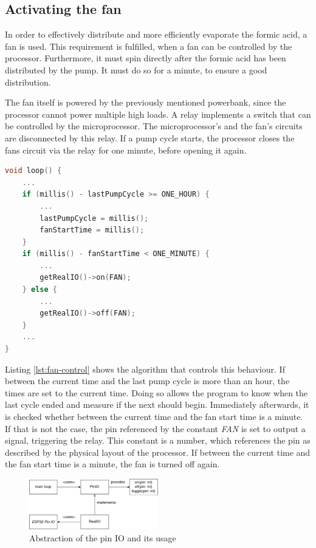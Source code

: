 \subsection{Activating the fan}\label{subsec:activating-the-fan}

In order to effectively distribute and more efficiently evaporate the formic acid, a fan is used.
This requirement is fulfilled, when a fan can be controlled by the processor.
Furthermore, it must spin directly after the formic acid has been distributed by the pump.
It must do so for a minute, to ensure a good distribution.

The fan itself is powered by the previously mentioned powerbank, since the processor cannot power multiple high loads.
A relay implements a switch that can be controlled by the microprocessor.
The microprocessor's and the fan's circuits are disconnected by this relay.
If a pump cycle starts, the processor closes the fans circuit via the relay for one minute, before opening it again.

\begin{lstlisting}[label={lst:fan-control},language=C++, caption=Controling the fan]
void loop() {
    ...
    if (millis() - lastPumpCycle >= ONE_HOUR) {
        ...
        lastPumpCycle = millis();
        fanStartTime = millis();
    }
    if (millis() - fanStartTime < ONE_MINUTE) {
        ...
        getRealIO()->on(FAN);
    } else {
        ...
        getRealIO()->off(FAN);
    }
    ...
}
\end{lstlisting}

Listing \ref{lst:fan-control} shows the algorithm that controls this behaviour.
If between the current time and the last pump cycle is more than an hour, the times are set to the current time.
Doing so allows the program to know when the last cycle ended and measure if the next should begin.
Immediately afterwards, it is checked whether between the current time and the fan start time is a minute.
If that is not the case, the pin referenced by the constant \textit{FAN} is set to output a signal, triggering the relay.
This constant is a number, which references the pin as described by the physical layout of the processor.
If between the current time and the fan start time is a minute, the fan is turned off again.

\begin{figure}
    \centering
    \includegraphics[width=0.5\textwidth]{img/realio-interaction}
    \caption{Abstraction of the pin IO and its usage}
    \label{fig:abstraction-of-pinio}
\end{figure}

